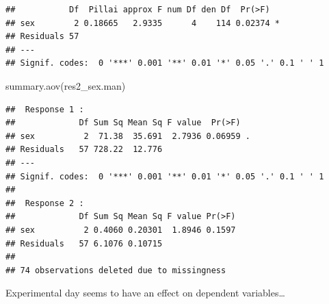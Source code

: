 \documentclass[
]{article}
\newenvironment{Shaded}{\begin{snugshade}}{\end{snugshade}}
\newcommand{\AttributeTok}[1]{\textcolor[rgb]{0.77,0.63,0.00}{#1}}
\newcommand{\FunctionTok}[1]{\textcolor[rgb]{0.00,0.00,0.00}{#1}}
\newcommand{\NormalTok}[1]{#1}
\newcommand{\OtherTok}[1]{\textcolor[rgb]{0.56,0.35,0.01}{#1}}
\newcommand{\SpecialCharTok}[1]{\textcolor[rgb]{0.00,0.00,0.00}{#1}}
\begin{document}
\begin{Shaded}
\end{Shaded}

\begin{verbatim}
##           Df  Pillai approx F num Df den Df  Pr(>F)  
## sex        2 0.18665   2.9335      4    114 0.02374 *
## Residuals 57                                         
## ---
## Signif. codes:  0 '***' 0.001 '**' 0.01 '*' 0.05 '.' 0.1 ' ' 1
\end{verbatim}

\begin{Shaded}
\begin{Highlighting}[]
\FunctionTok{summary.aov}\NormalTok{(res2\_sex.man)}
\end{Highlighting}
\end{Shaded}

\begin{verbatim}
##  Response 1 :
##             Df Sum Sq Mean Sq F value  Pr(>F)  
## sex          2  71.38  35.691  2.7936 0.06959 .
## Residuals   57 728.22  12.776                  
## ---
## Signif. codes:  0 '***' 0.001 '**' 0.01 '*' 0.05 '.' 0.1 ' ' 1
## 
##  Response 2 :
##             Df Sum Sq Mean Sq F value Pr(>F)
## sex          2 0.4060 0.20301  1.8946 0.1597
## Residuals   57 6.1076 0.10715               
## 
## 74 observations deleted due to missingness
\end{verbatim}

Experimental day seems to have an effect on dependent variables\ldots{}

\begin{Shaded}
\end{Shaded}
\end{document}
